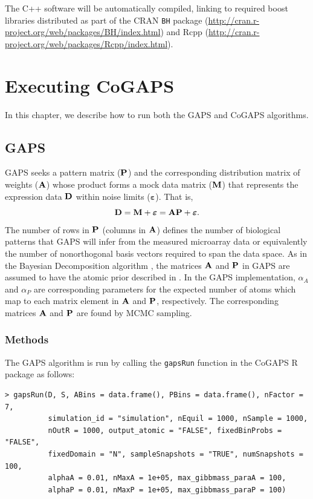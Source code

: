 \documentclass{report}
\begin{document}
\par The C++ software will be automatically compiled, linking to required boost libraries distributed as part of the CRAN \texttt{BH} package (\url{http://cran.r-project.org/web/packages/BH/index.html}) and Rcpp (\url{http://cran.r-project.org/web/packages/Rcpp/index.html}).

\chapter{Executing CoGAPS}

\par In this chapter, we describe how to run both the GAPS and CoGAPS algorithms.

\section{GAPS} \label{GAPSRun}

\par GAPS seeks a pattern matrix (${\bf{P}}$) and the corresponding distribution matrix of weights (${\bf{A}}$) whose product forms a mock data matrix (${\bf{M}}$) that represents the expression data ${\bf{D}}$ within noise limits ($\boldsymbol{\varepsilon}$).  That is,
\begin{equation}
{\bf{D}} = {\bf{M}} + \boldsymbol{\varepsilon} = {\bf{A}}{\bf{P}} + \boldsymbol{\varepsilon}.
\label{eq:matrixDecomp}
\end{equation}
The number of rows in ${\bf{P}}$ (columns in ${\bf{A}}$) defines the number of biological patterns that GAPS will infer from the measured microarray data or equivalently the number of nonorthogonal basis vectors required to span the data space.  As in the Bayesian Decomposition algorithm \cite{Ochs2006}, the matrices ${\bf{A}}$ and ${\bf{P}}$ in GAPS are assumed to have the atomic prior described in \cite{Sibisi1997}.  In the GAPS implementation, $\alpha_{A}$ and $\alpha_{P}$ are corresponding parameters for the expected number of atoms which map to each matrix element in ${\bf{A}}$ and ${\bf{P}}$, respectively.  The corresponding matrices ${\bf{A}}$ and ${\bf{P}}$ are found by MCMC sampling.

\subsection{Methods}

\par The GAPS algorithm is run by calling the \texttt{gapsRun} function in the CoGAPS R package as follows:
\begin{verbatim}
> gapsRun(D, S, ABins = data.frame(), PBins = data.frame(), nFactor = 7,
          simulation_id = "simulation", nEquil = 1000, nSample = 1000,
          nOutR = 1000, output_atomic = "FALSE", fixedBinProbs = "FALSE",
          fixedDomain = "N", sampleSnapshots = "TRUE", numSnapshots = 100,
          alphaA = 0.01, nMaxA = 1e+05, max_gibbmass_paraA = 100,
          alphaP = 0.01, nMaxP = 1e+05, max_gibbmass_paraP = 100)
\end{verbatim}
\end{document}
